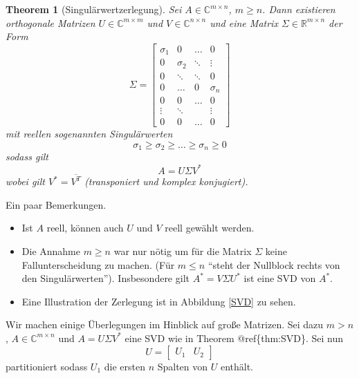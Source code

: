 \documentclass[]{book}
\providecommand{\tightlist}{%
  \setlength{\itemsep}{0pt}\setlength{\parskip}{0pt}}
\newtheorem{theorem}{Theorem}[chapter]
\theoremstyle{definition}
\theoremstyle{definition}
\theoremstyle{definition}
\theoremstyle{definition}
\theoremstyle{remark}
\begin{document}
\begin{theorem}[Singulärwertzerlegung]
\protect\hypertarget{thm:svd}{}\label{thm:svd}Sei \(A\in \mathbb C^{m\times n}\), \(m\geq n\). Dann existieren orthogonale Matrizen \(U \in \mathbb C^{m\times m}\) und \(V\in \mathbb C^{n\times n}\) und eine Matrix \(\Sigma \in \mathbb R^{m\times n}\) der Form
\begin{equation*}
\Sigma = 
\begin{bmatrix}
\sigma_1 & 0 & \dots & 0\\
0 & \sigma_2 &\ddots & \vdots\\
0 & \ddots & \ddots &0\\
  0 & \dots&0 & \sigma_n \\
  0 & 0 & \dots & 0 \\
  \vdots & \ddots &  & \vdots\\
  0 & 0 & \dots & 0
\end{bmatrix}
\end{equation*}
mit reellen sogenannten \emph{Singulärwerten}
\begin{equation*}
\sigma_1 \geq \sigma_2 \geq \dots \geq \sigma_n \geq 0
\end{equation*}
sodass gilt
\begin{equation*}
A = U \Sigma V^*
\end{equation*}
wobei gilt \(V^* = \overline{V^T}\) (transponiert und komplex konjugiert).
\end{theorem}

Ein paar Bemerkungen.

\begin{itemize}
\tightlist
\item
  Ist \(A\) reell, können auch \(U\) und \(V\) reell gewählt werden.
\item
  Die Annahme \(m \geq n\) war nur nötig um für die Matrix \(\Sigma\) keine Fallunterscheidung zu machen. (Für \(m\leq n\) ``steht der Nullblock rechts von den Singulärwerten''). Insbesondere gilt \(A^* = V\Sigma U^*\) ist eine SVD von \(A^*\).
\item
  Eine Illustration der Zerlegung ist in Abbildung \ref{SVD} zu sehen.
\end{itemize}

Wir machen einige Überlegungen im Hinblick auf große Matrizen. Sei dazu \(m>n\), \(A\in \mathbb C^{m\times n}\) und \(A=U\Sigma V^*\) eine SVD wie in Theorem @ref\{thm:SVD\}. Sei nun
\begin{equation*}
U = \begin{bmatrix}
U_1 & U_2
\end{bmatrix}
\end{equation*}
partitioniert sodass \(U_1\) die ersten \(n\) Spalten von \(U\) enthält.
\end{document}
